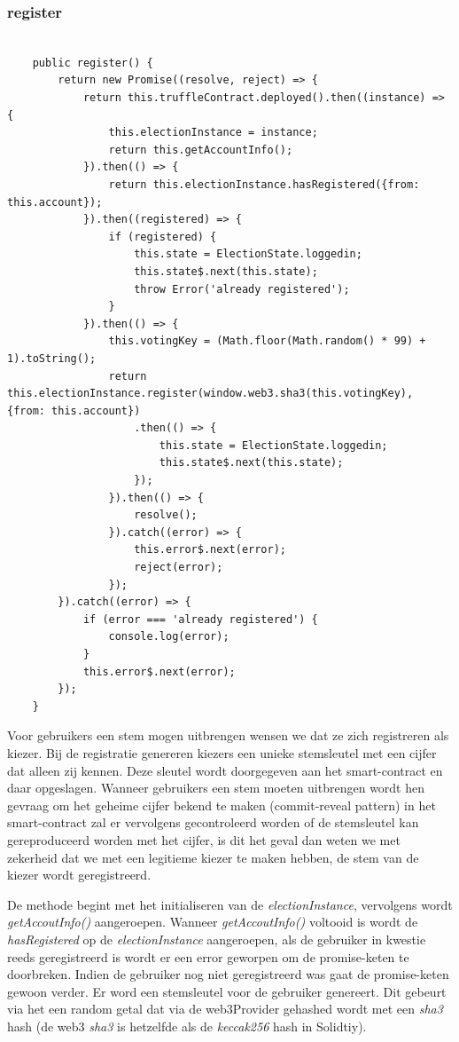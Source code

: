 	\subsubsection{register}
	\lstset{language=JavaScriptSolidity} 
	\begin{lstlisting}[numbers=none]
	
	public register() {
		return new Promise((resolve, reject) => {
			return this.truffleContract.deployed().then((instance) => {
				this.electionInstance = instance;
				return this.getAccountInfo();
			}).then(() => {
				return this.electionInstance.hasRegistered({from: this.account});
			}).then((registered) => {
				if (registered) {
					this.state = ElectionState.loggedin;
					this.state$.next(this.state);
					throw Error('already registered');
				}
			}).then(() => {
				this.votingKey = (Math.floor(Math.random() * 99) + 1).toString();
				return this.electionInstance.register(window.web3.sha3(this.votingKey), {from: this.account})
					.then(() => {
						this.state = ElectionState.loggedin;
						this.state$.next(this.state);
					});
				}).then(() => {
					resolve();
				}).catch((error) => {
					this.error$.next(error);
					reject(error);
				});
		}).catch((error) => {
			if (error === 'already registered') {
				console.log(error);
			}
			this.error$.next(error);
		});
	}
	\end{lstlisting}
		Voor gebruikers een stem mogen uitbrengen wensen we dat ze zich registreren als kiezer. Bij de registratie genereren kiezers een unieke stemsleutel met een cijfer dat alleen zij kennen. Deze sleutel wordt doorgegeven aan het smart-contract en daar opgeslagen. Wanneer gebruikers een stem moeten uitbrengen wordt hen gevraag om het geheime cijfer bekend te maken (commit-reveal pattern) in het smart-contract zal er vervolgens gecontroleerd worden of de stemsleutel kan gereproduceerd worden met het cijfer, is dit het geval dan weten we met zekerheid dat we met een legitieme kiezer te maken hebben, de stem van de kiezer wordt geregistreerd.
		
		De methode begint met het initialiseren van de \textit{electionInstance}, vervolgens wordt \textit{getAccoutInfo()} aangeroepen. Wanneer \textit{getAccoutInfo()} voltooid is wordt de \textit{hasRegistered} op de \textit{electionInstance} aangeroepen, als de gebruiker in kwestie reeds geregistreerd is wordt er een error geworpen om de promise-keten te doorbreken. Indien de gebruiker nog niet geregistreerd was gaat de promise-keten gewoon verder. Er word een stemsleutel voor de gebruiker genereert. Dit gebeurt via het een random getal dat via de web3Provider gehashed wordt met een \textit{sha3} hash (de web3 \textit{sha3} is hetzelfde als de \textit{keccak256} hash in Solidtiy).
		
